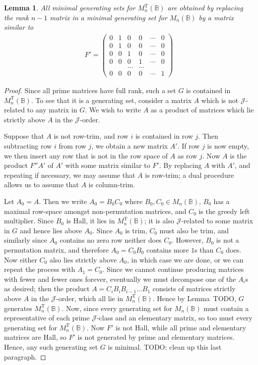 \documentclass[11pt]{article}
\newtheorem{lemma}[thm]{Lemma}
\numberwithin{equation}{section}
\newcommand{\B}{\mathbb{B}}
\newcommand{\Bn}{M_n(\B)}
\newcommand{\MTn}{M_n^{\text{T}}(\B)}
\newcommand{\J}{\mathscr{J}}
\begin{document}
\begin{lemma}
  All minimal generating sets for $\MTn$ are obtained by replacing the rank $n -
  1$ matrix in a minimal generating set for $\Bn$ by a matrix similar to
  \begin{align*}
    F' = \begin{pmatrix}
      0 & 1 & 0 & 0 & \cdots & 0 \\
      0 & 1 & 0 & 0 & \cdots & 0 \\
      0 & 0 & 1 & 0 & \cdots & 0 \\
      0 & 0 & 0 & 1 & \cdots & 0 \\
        &   &   \dots & \dots & \\
      0 & 0 & 0 & 0 & \cdots & 1
    \end{pmatrix}
  \end{align*}
\end{lemma}
\begin{proof}
  Since all prime matrices have full rank, such a set $G$ is contained in
  $\MTn$. To see that it is a generating set, consider a matrix $A$ which is not
  $\J$-related to any matrix in $G$. We wish to write $A$ as a product of
  matrices which lie strictly above $A$ in the $\J$-order. 
  
  Suppose that $A$ is not row-trim, and row $i$ is contained in row $j$. Then
  subtracting row $i$ from row $j$, we obtain a new matrix $A'$. If row $j$ is
  now empty, we then insert any row that is not in the row space of $A$ as row
  $j$. Now $A$ is the product $F''A'$ of $A'$ with some matrix similar to $F'$. By
  replacing $A$ with $A'$, and repeating if necessary, we may assume that $A$ is
  row-trim; a dual procedure allows us to assume that $A$ is column-trim. 
  
  Let $A_0 = A$. Then we write $A_0 = B_0C_0$ where $B_0, C_0 \in \Bn$, $B_0$ has a
  maximal row-space amongst non-permutation matrices, and $C_0$ is the greedy left
  multiplier. Since $B_0$ is Hall, it lies in $\MTn$; it is also $\J$-related to
  some matrix in $G$ and hence lies above $A_0$. Since $A_0$ is trim, $C_0$ must also
  be trim, and similarly since $A_0$ contains no zero row neither does $C_0$.
  However, $B_0$ is not a permutation matrix, and therefore $A_0 = C_0B_0$ contains more
  $1$s than $C_0$ does. Now either $C_0$ also lies strictly above $A_0$, in which case
  we are done, or we can repeat the process with $A_1 = C_0$. Since we
  cannot continue producing matrices with fewer and fewer ones forever,
  eventually we must decompose one of the $A_i$s as desired; then the product $A
  = C_i B_i B_{i - 1} \ldots B_1$ consists of matrices strictly above $A$ in the
  $\J$-order, which all lie in $\MTn$. Hence by Lemma~TODO, $G$ generates
  $\MTn$.
  Now, since every generating set for $\Bn$ must contain a representative of
  each prime $\J$-class and an elementary matrix, so too must every generating
  set for $\MTn$. Now $F'$ is not Hall, while all prime and elementary matrices
  are Hall, so $F'$ is not generated by prime and elementary matrices. Hence,
  any such generating set $G$ is minimal. TODO: clean up this last paragraph.
\end{proof}

\printbibliography
\end{document}
